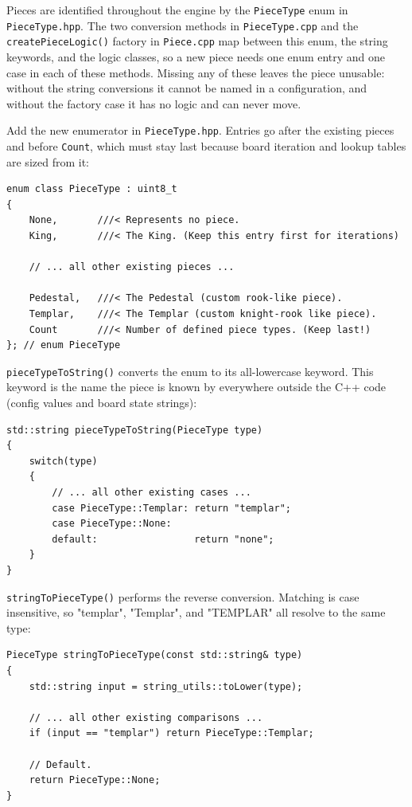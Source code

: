 Pieces are identified throughout the engine by the \texttt{PieceType} enum in \texttt{PieceType.hpp}. The two conversion methods in \texttt{PieceType.cpp} and the \texttt{createPieceLogic()} factory in \texttt{Piece.cpp} map between this enum, the string keywords, and the logic classes, so a new piece needs one enum entry and one case in each of these methods. Missing any of these leaves the piece unusable: without the string conversions it cannot be named in a configuration, and without the factory case it has no logic and can never move.

Add the new enumerator in \texttt{PieceType.hpp}. Entries go after the existing pieces and before \texttt{Count}, which must stay last because board iteration and lookup tables are sized from it:

\begin{lstlisting}[style=cppstyle]
enum class PieceType : uint8_t
{
    None,       ///< Represents no piece.
    King,       ///< The King. (Keep this entry first for iterations)

    // ... all other existing pieces ...

    Pedestal,   ///< The Pedestal (custom rook-like piece).
    Templar,    ///< The Templar (custom knight-rook like piece).
    Count       ///< Number of defined piece types. (Keep last!)
}; // enum PieceType
\end{lstlisting}

\texttt{pieceTypeToString()} converts the enum to its all-lowercase keyword. This keyword is the name the piece is known by everywhere outside the C++ code (config values and board state strings):

\begin{lstlisting}[style=cppstyle]
std::string pieceTypeToString(PieceType type)
{
    switch(type)
    {
        // ... all other existing cases ...
        case PieceType::Templar: return "templar";
        case PieceType::None:
        default:                 return "none";
    }
}
\end{lstlisting}

\texttt{stringToPieceType()} performs the reverse conversion. Matching is case insensitive, so "templar", "Templar", and "TEMPLAR" all resolve to the same type:

\begin{lstlisting}[style=cppstyle]
PieceType stringToPieceType(const std::string& type)
{
    std::string input = string_utils::toLower(type);

    // ... all other existing comparisons ...
    if (input == "templar") return PieceType::Templar;

    // Default.
    return PieceType::None;
}
\end{lstlisting}

